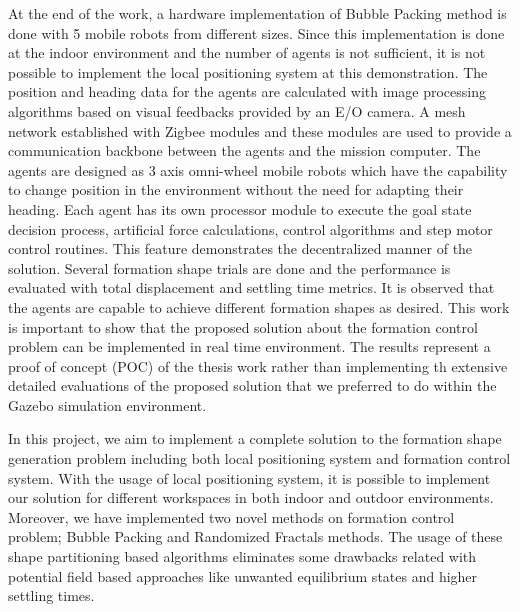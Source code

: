 At the end of the work, a hardware implementation of Bubble Packing method is done with 5 mobile robots from different sizes. Since this implementation is done at the  indoor environment and the number of agents is not sufficient, it is not possible to implement the local positioning system at this demonstration. The position and heading data for the agents are calculated with image processing algorithms based on visual feedbacks provided by an E/O camera. A mesh network established with Zigbee modules and these modules are used to provide a communication backbone between the agents and the mission computer. The agents are designed as 3 axis omni-wheel mobile robots which have the capability to change position in the environment without the need for adapting their heading. Each agent has its own processor module to execute the goal state decision process, artificial force calculations, control algorithms and step motor control routines. This feature demonstrates the decentralized manner of the solution. Several formation shape trials are done and the performance is evaluated with total displacement and settling time metrics. It is observed that the agents are capable to achieve different formation shapes as desired. This work is important to show that the proposed solution about the formation control problem can be implemented in real time environment. The results represent a proof of concept (POC) of the thesis work rather than implementing th extensive detailed evaluations of the proposed solution that we preferred to do within the Gazebo simulation environment.

In this project, we aim to implement a complete solution to the formation shape generation problem including both local positioning system and formation control system. With the usage of local positioning system, it is possible to implement our solution for different workspaces in both indoor and outdoor environments. Moreover, we have implemented two novel methods on formation control problem; Bubble Packing and Randomized Fractals methods. The usage of these shape partitioning based algorithms eliminates some drawbacks related with potential field based approaches like unwanted equilibrium states and higher settling times. 

